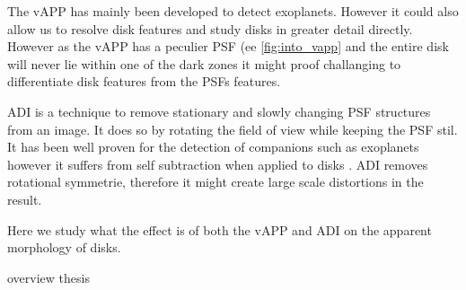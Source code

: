 
The \ac{vAPP} has mainly been developed to detect exoplanets. However it could also allow us to resolve disk features and study disks in greater detail directly. However as the \ac{vAPP} has a peculier \ac{PSF} (ee \autoref{fig:into_vapp} and the entire disk will never lie within one of the dark zones it might proof challanging to differentiate disk features from the \acp{PSF} features. 

\ac{ADI} is a technique to remove stationary and slowly changing \ac{PSF} structures from an image. It does so by rotating the field of view while keeping the \ac{PSF} stil. It has been well proven for the detection of companions such as exoplanets however it suffers from self subtraction when applied to disks \cite{self_sub1} \cite{self_sub2}. \ac{ADI} removes rotational symmetrie, therefore it might create large scale distortions in the result.

Here we study what the effect is of both the \ac{vAPP} and \ac{ADI} on the apparent morphology of disks.

overview thesis


